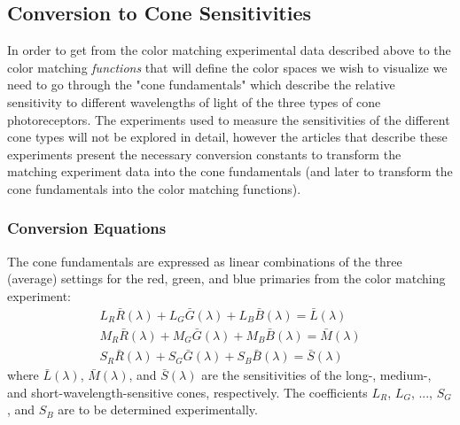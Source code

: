 \documentclass[twocolumn]{article}
\begin{document}
\subsection{Conversion to Cone Sensitivities}
In order to get from the color matching experimental data described above to the color matching \textit{functions} that will define the color spaces we wish to visualize we need to go through the "cone fundamentals" which describe the relative sensitivity to different wavelengths of light of the three types of cone photoreceptors.  The experiments used to measure the sensitivities of the different cone types will not be explored in detail, however the articles that describe these experiments present the necessary conversion constants to transform the matching experiment data into the cone fundamentals (and later to transform the cone fundamentals into the color matching functions).
\subsubsection{Conversion Equations}
The cone fundamentals are expressed as linear combinations of the three (average) settings for the red, green, and blue primaries from the color matching experiment:
\begin{equation}
    \begin{aligned}
        L_R\bar{R}(\lambda)+L_G\bar{G}(\lambda)+L_B\bar{B}(\lambda)=\bar{L}(\lambda)\\
        M_R\bar{R}(\lambda)+M_G\bar{G}(\lambda)+M_B\bar{B}(\lambda)=\bar{M}(\lambda)\\
        S_R\bar{R}(\lambda)+S_G\bar{G}(\lambda)+S_B\bar{B}(\lambda)=\bar{S}(\lambda)
    \end{aligned}
\end{equation}
where $\bar{L}(\lambda)$, $\bar{M}(\lambda)$, and $\bar{S}(\lambda)$ are the sensitivities of the long-, medium-, and short-wavelength-sensitive cones, respectively.  The coefficients $L_R$, $L_G$, ..., $S_G$, and $S_B$ are to be determined experimentally.
\end{document}
